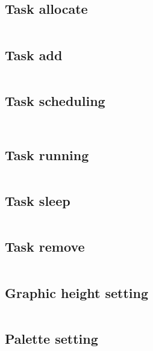\documentclass{swfcthesis}
\begin{document}
\subsection{Task allocate}
\label{sec:task-allocate}
\inputminted[tabsize=2, firstline=115, lastline=143,
linenos=true]{c}{../../src/kernel/mtask.c}


\subsection{Task add}
\label{sec:task-add}
\inputminted[tabsize=2, firstline=14, lastline=21,
linenos=true]{c}{../../src/kernel/mtask.c}

\subsection{Task scheduling}
\label{sec:task-scheduling}
\inputminted[tabsize=2, firstline=186, lastline=205,
linenos=true]{c}{../../src/kernel/mtask.c}
\inputminted[tabsize=2, firstline=49, lastline=63,
linenos=true]{c}{../../src/kernel/mtask.c}


\subsection{Task running}
\label{sec:task-running}
\inputminted[tabsize=2, firstline=146, lastline=165,
linenos=true]{c}{../../src/kernel/mtask.c}

\subsection{Task sleep}
\label{sec:task-sleep-1}
\inputminted[tabsize=2, firstline=167, lastline=184,
linenos=true]{c}{../../src/kernel/mtask.c}

\subsection{Task remove}
\label{sec:task-remove}
\inputminted[tabsize=2, firstline=23, lastline=47,
linenos=true]{c}{../../src/kernel/mtask.c}

\subsection{Graphic height setting}
\label{sec:graph-height-sett}
\inputminted[tabsize=2, firstline=250, lastline=322,
linenos=true]{c}{../../src/kernel/sheet.c}

\subsection{Palette setting}
\label{sec:palette-setting}
\inputminted[tabsize=2, firstline=3, lastline=64,
linenos=true]{c}{../../src/kernel/graphic.c}
\end{document}
